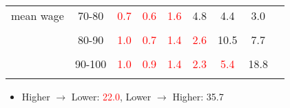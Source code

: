 \documentclass{beamer}
\begin{document}
{\begin{table}[t]
\begin{center}
\begin{tabular}{ccccccccc
        }
        mean wage                                                & 70-80                                          & \textcolor{red}{0.7} & \textcolor{red}{0.6} & \textcolor{red}{1.6} & 4.8                  & 4.4                  & 3.0      \\
                                                                 &                                                &                      &                      &                      &                      &                      &          \\
                                                                 & 80-90                                          & \textcolor{red}{1.0} & \textcolor{red}{0.7} & \textcolor{red}{1.4} & \textcolor{red}{2.6} & 10.5                 & 7.7      \\
                                                                 &                                                &                      &                      &                      &                      &                      &          \\
                                                                 & 90-100                                         & \textcolor{red}{1.0} & \textcolor{red}{0.9} & \textcolor{red}{1.4} & \textcolor{red}{2.3} & \textcolor{red}{5.4} & 18.8     \\
        \\\hline
      \end{tabular}
    \end{center}
  \end{table}
  \begin{itemize}
    \item Higher $\rightarrow$ Lower: \textcolor{red}{22.0},  Lower $\rightarrow$ Higher: 35.7
  \end{itemize}
}
\end{document}

